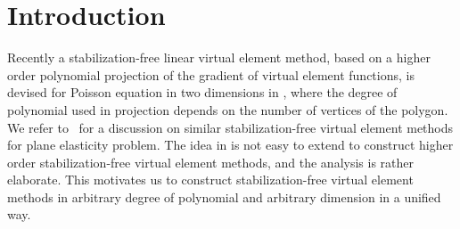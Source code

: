 \documentclass[10pt]{amsart}
\numberwithin{equation}{section}
\begin{document}


\maketitle


\section{Introduction}

Recently a stabilization-free linear virtual element method, based on a higher order polynomial projection of the gradient of virtual element functions, is devised for Poisson equation in two dimensions in \cite{BerroneBorioMarcon2021,BerroneBorioMarcon2022}, where the degree of polynomial used in projection depends on the number of vertices of the polygon. We refer to~\cite{DAltriMirandaPatrunoSacco2021} for a discussion on similar stabilization-free virtual element methods for plane elasticity problem.
The idea in \cite{BerroneBorioMarcon2021,BerroneBorioMarcon2022} is not easy to extend to construct higher order stabilization-free virtual element methods, and
the analysis is rather elaborate. 
This motivates us to construct stabilization-free virtual element methods in arbitrary degree of polynomial and arbitrary dimension in a unified way.
\end{document}
